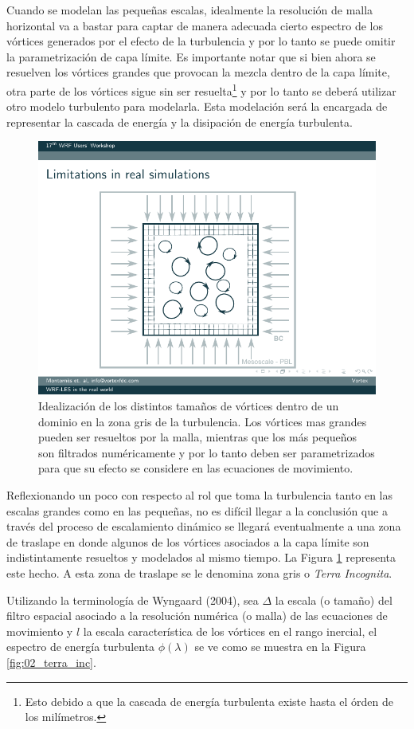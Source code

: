 Cuando se modelan las pequeñas escalas, idealmente la resolución de malla horizontal va a bastar para captar de manera adecuada cierto espectro de los vórtices generados por el efecto de la turbulencia y por lo tanto se puede omitir la parametrización de capa límite. Es importante notar que si bien ahora se resuelven los vórtices grandes que provocan la mezcla dentro de la capa límite, otra parte de los vórtices sigue sin ser resuelta\footnote{Esto debido a que la cascada de energía turbulenta existe hasta el órden de los milímetros.} y por lo tanto se deberá utilizar otro modelo turbulento para modelarla. Esta modelación será la encargada de representar la cascada de energía y la disipación de energía turbulenta.

\begin{figure}[h!]
	\centering
	\includegraphics[width=0.4\linewidth,trim={2.67cm 1.35cm 3.1cm 2.25cm},clip]{Imagenes/02/grid}
	\caption{Idealización de los distintos tamaños de vórtices dentro de un dominio en la zona gris de la turbulencia. Los vórtices mas grandes pueden ser resueltos por la malla, mientras que los más pequeños son filtrados numéricamente y por lo tanto deben ser parametrizados para que su efecto se considere en las ecuaciones de movimiento.}
	\label{fig:02_grid_vortex}
\end{figure}

Reflexionando un poco con respecto al rol que toma la turbulencia tanto en las escalas grandes como en las pequeñas, no es difícil llegar a la conclusión que a través del proceso de escalamiento dinámico se llegará eventualmente a una zona de traslape en donde algunos de los vórtices asociados a la capa límite son indistintamente resueltos y modelados al mismo tiempo. La Figura \ref{fig:02_grid_vortex} representa este hecho. 
A esta zona de traslape se le denomina zona gris o \emph{Terra Incognita}.

Utilizando la terminología de Wyngaard (2004), sea $\Delta$ la escala (o tamaño) del filtro espacial asociado a la resolución numérica (o malla) de las ecuaciones de movimiento y $l$ la escala característica de los vórtices en el rango inercial, el espectro de energía turbulenta $\phi(\lambda)$ se ve como se muestra en la Figura \ref{fig:02_terra_inc}.

